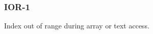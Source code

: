\subsubsection{IOR-1}\label{sec:error_code_ior_1}

Index out of range during array or text access.


